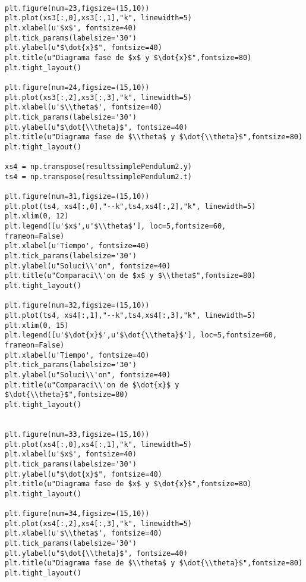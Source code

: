 \documentclass[12pt,letterpaper]{article}
\begin{document}
\begin{verbatim}
    
plt.figure(num=23,figsize=(15,10))
plt.plot(xs3[:,0],xs3[:,1],"k", linewidth=5)
plt.xlabel(u'$x$', fontsize=40)
plt.tick_params(labelsize='30')
plt.ylabel(u"$\dot{x}$", fontsize=40)
plt.title(u"Diagrama fase de $x$ y $\dot{x}$",fontsize=80)
plt.tight_layout()

plt.figure(num=24,figsize=(15,10))
plt.plot(xs3[:,2],xs3[:,3],"k", linewidth=5)
plt.xlabel(u'$\\theta$', fontsize=40)
plt.tick_params(labelsize='30')
plt.ylabel(u"$\dot{\\theta}$", fontsize=40)
plt.title(u"Diagrama fase de $\\theta$ y $\dot{\\theta}$",fontsize=80)
plt.tight_layout()  

xs4 = np.transpose(resultssimplePendulum2.y)
ts4 = np.transpose(resultssimplePendulum2.t)

plt.figure(num=31,figsize=(15,10))
plt.plot(ts4, xs4[:,0],"--k",ts4,xs4[:,2],"k", linewidth=5)
plt.xlim(0, 12)
plt.legend([u'$x$',u'$\\theta$'], loc=5,fontsize=60,
frameon=False)
plt.xlabel(u'Tiempo', fontsize=40)
plt.tick_params(labelsize='30')
plt.ylabel(u"Soluci\\'on", fontsize=40)
plt.title(u"Comparaci\\'on de $x$ y $\\theta$",fontsize=80)
plt.tight_layout()

plt.figure(num=32,figsize=(15,10))
plt.plot(ts4, xs4[:,1],"--k",ts4,xs4[:,3],"k", linewidth=5)
plt.xlim(0, 15)
plt.legend([u'$\dot{x}$',u'$\dot{\\theta}$'], loc=5,fontsize=60,
frameon=False)
plt.xlabel(u'Tiempo', fontsize=40)
plt.tick_params(labelsize='30')
plt.ylabel(u"Soluci\\'on", fontsize=40)
plt.title(u"Comparaci\\'on de $\dot{x}$ y $\dot{\\theta}$",fontsize=80)
plt.tight_layout()
    
    
plt.figure(num=33,figsize=(15,10))
plt.plot(xs4[:,0],xs4[:,1],"k", linewidth=5)
plt.xlabel(u'$x$', fontsize=40)
plt.tick_params(labelsize='30')
plt.ylabel(u"$\dot{x}$", fontsize=40)
plt.title(u"Diagrama fase de $x$ y $\dot{x}$",fontsize=80)
plt.tight_layout()

plt.figure(num=34,figsize=(15,10))
plt.plot(xs4[:,2],xs4[:,3],"k", linewidth=5)
plt.xlabel(u'$\\theta$', fontsize=40)
plt.tick_params(labelsize='30')
plt.ylabel(u"$\dot{\\theta}$", fontsize=40)
plt.title(u"Diagrama fase de $\\theta$ y $\dot{\\theta}$",fontsize=80)
plt.tight_layout()  

\end{verbatim}
\end{document}
